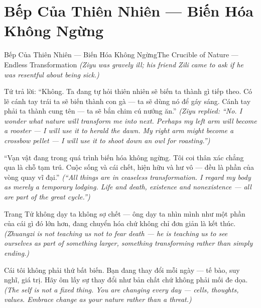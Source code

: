 \section{Bếp Của Thiên Nhiên — Biến Hóa Không Ngừng}
\begin{truyen}{Bếp Của Thiên Nhiên — Biến Hóa Không Ngừng}{The Crucible of Nature — Endless Transformation}
\textit{(Ziyu was gravely ill; his friend Zili came to ask if he was resentful about being sick.)}

Tứ trả lời: ``Không. Ta đang tự hỏi thiên nhiên sẽ biến ta thành gì tiếp theo. Có lẽ cánh tay trái ta sẽ biến thành con gà — ta sẽ dùng nó để gáy sáng. Cánh tay phải ta thành cung tên — ta sẽ bắn chim cú nướng ăn.''
\textit{(Ziyu replied: ``No. I wonder what nature will transform me into next. Perhaps my left arm will become a rooster — I will use it to herald the dawn. My right arm might become a crossbow pellet — I will use it to shoot down an owl for roasting.'')}

``Vạn vật đang trong quá trình biến hóa không ngừng. Tôi coi thân xác chẳng qua là chỗ tạm trú. Cuộc sống và cái chết, hiện hữu và hư vô — đều là phần của vòng quay vĩ đại.''
\textit{(``All things are in ceaseless transformation. I regard my body as merely a temporary lodging. Life and death, existence and nonexistence — all are part of the great cycle.'')}

Trang Tử không dạy ta không sợ chết — ông dạy ta nhìn mình như một phần của cái gì đó lớn hơn, đang chuyển hóa chứ không chỉ đơn giản là kết thúc.
\textit{(Zhuangzi is not teaching us not to fear death — he is teaching us to see ourselves as part of something larger, something transforming rather than simply ending.)}

\end{truyen}

\begin{baihoc}
Cái tôi không phải thứ bất biến. Bạn đang thay đổi mỗi ngày — tế bào, suy nghĩ, giá trị. Hãy ôm lấy sự thay đổi như bản chất chứ không phải mối đe dọa.
\textit{(The self is not a fixed thing. You are changing every day — cells, thoughts, values. Embrace change as your nature rather than a threat.)}
\end{baihoc}
\ngancach

